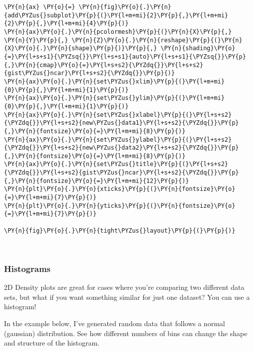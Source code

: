 \begin{tcolorbox}[breakable, size=fbox, boxrule=1pt, pad at break*=1mm,colback=cellbackground, colframe=cellborder]
\begin{Verbatim}[commandchars=\\\{\}]
\PY{n}{ax} \PY{o}{=} \PY{n}{fig}\PY{o}{.}\PY{n}{add\PYZus{}subplot}\PY{p}{(}\PY{l+m+mi}{2}\PY{p}{,}\PY{l+m+mi}{2}\PY{p}{,}\PY{l+m+mi}{4}\PY{p}{)}
\PY{n}{ax}\PY{o}{.}\PY{n}{pcolormesh}\PY{p}{(}\PY{n}{X}\PY{p}{,} \PY{n}{Y}\PY{p}{,} \PY{n}{Z}\PY{o}{.}\PY{n}{reshape}\PY{p}{(}\PY{n}{X}\PY{o}{.}\PY{n}{shape}\PY{p}{)}\PY{p}{,} \PY{n}{shading}\PY{o}{=}\PY{l+s+s1}{\PYZsq{}}\PY{l+s+s1}{auto}\PY{l+s+s1}{\PYZsq{}}\PY{p}{,}\PY{n}{cmap}\PY{o}{=}\PY{l+s+s2}{\PYZdq{}}\PY{l+s+s2}{gist\PYZus{}ncar}\PY{l+s+s2}{\PYZdq{}}\PY{p}{)}
\PY{n}{ax}\PY{o}{.}\PY{n}{set\PYZus{}xlim}\PY{p}{(}\PY{l+m+mi}{0}\PY{p}{,}\PY{l+m+mi}{1}\PY{p}{)}
\PY{n}{ax}\PY{o}{.}\PY{n}{set\PYZus{}ylim}\PY{p}{(}\PY{l+m+mi}{0}\PY{p}{,}\PY{l+m+mi}{1}\PY{p}{)}
\PY{n}{ax}\PY{o}{.}\PY{n}{set\PYZus{}xlabel}\PY{p}{(}\PY{l+s+s2}{\PYZdq{}}\PY{l+s+s2}{new\PYZus{}data1}\PY{l+s+s2}{\PYZdq{}}\PY{p}{,}\PY{n}{fontsize}\PY{o}{=}\PY{l+m+mi}{8}\PY{p}{)}
\PY{n}{ax}\PY{o}{.}\PY{n}{set\PYZus{}ylabel}\PY{p}{(}\PY{l+s+s2}{\PYZdq{}}\PY{l+s+s2}{new\PYZus{}data2}\PY{l+s+s2}{\PYZdq{}}\PY{p}{,}\PY{n}{fontsize}\PY{o}{=}\PY{l+m+mi}{8}\PY{p}{)}
\PY{n}{ax}\PY{o}{.}\PY{n}{set\PYZus{}title}\PY{p}{(}\PY{l+s+s2}{\PYZdq{}}\PY{l+s+s2}{gist\PYZus{}ncar}\PY{l+s+s2}{\PYZdq{}}\PY{p}{,}\PY{n}{fontsize}\PY{o}{=}\PY{l+m+mi}{12}\PY{p}{)}
\PY{n}{plt}\PY{o}{.}\PY{n}{xticks}\PY{p}{(}\PY{n}{fontsize}\PY{o}{=}\PY{l+m+mi}{7}\PY{p}{)}
\PY{n}{plt}\PY{o}{.}\PY{n}{yticks}\PY{p}{(}\PY{n}{fontsize}\PY{o}{=}\PY{l+m+mi}{7}\PY{p}{)}

\PY{n}{fig}\PY{o}{.}\PY{n}{tight\PYZus{}layout}\PY{p}{(}\PY{p}{)}
\end{Verbatim}
\end{tcolorbox}

    \begin{center}
    \end{center}
    { \hspace*{\fill} \\}
    
    \hypertarget{histograms}{%
\subsubsection{Histograms}\label{histograms}}

2D Density plots are great for cases where you're comparing two
different data sets, but what if you want something similar for just one
dataset? You can use a histogram!

In the example below, I've generated random data that follows a normal
(gaussian) distribution. See how different numbers of bins can change
the shape and structure of the histogram.

